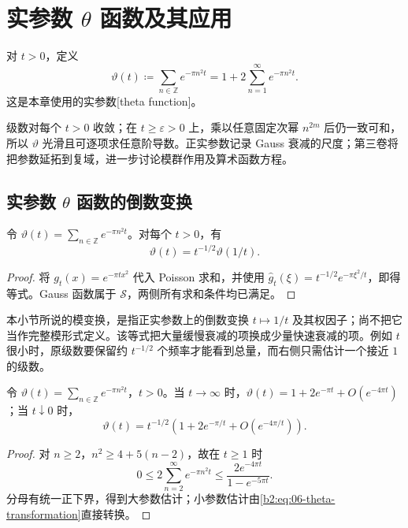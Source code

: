 \section{实参数 \texorpdfstring{\(\theta\)}{\AnalysisPdfTheta} 函数及其应用}
\label{b2:sec:0603}

\begin{definition}\label{b2:def:06-theta}
对 \(t>0\)，定义
\[
 \vartheta(t)\coloneqq\sum_{n\in\mathbb Z}e^{-\pi n^2t}
 =1+2\sum_{n=1}^\infty e^{-\pi n^2t}.
\]
这是本章使用的实参数[theta function]。
\end{definition}

级数对每个 \(t>0\) 收敛；在 \(t\geq\varepsilon>0\) 上，乘以任意固定次幂 \(n^{2m}\) 后仍一致可和，所以 \(\vartheta\) 光滑且可逐项求任意阶导数。正实参数记录 Gauss 衰减的尺度；第三卷将把参数延拓到复域，进一步讨论模群作用及算术函数方程。

\subsection{实参数 \texorpdfstring{\(\theta\)}{\AnalysisPdfTheta} 函数的倒数变换}
\label{b2:subsec:060301}

\begin{theorem}\label{b2:thm:06-theta-transformation}
令 \(\vartheta(t)=\sum_{n\in\mathbb Z}e^{-\pi n^2t}\)。对每个 \(t>0\)，有
\begin{equation}\label{b2:eq:06-theta-transformation}
 \vartheta(t)=t^{-1/2}\vartheta(1/t).
\end{equation}
\end{theorem}
\begin{proof}
将 \(g_t(x)=e^{-\pi t x^2}\) 代入 Poisson 求和，并使用 \(\widehat g_t(\xi)=t^{-1/2}e^{-\pi\xi^2/t}\)，即得等式。Gauss 函数属于 \(\mathcal S\)，两侧所有求和条件均已满足。
\end{proof}

本小节所说的模变换，是指正实参数上的倒数变换 \(t\mapsto1/t\) 及其权因子；尚不把它当作完整模形式定义。该等式把大量缓慢衰减的项换成少量快速衰减的项。例如 \(t\) 很小时，原级数要保留约 \(t^{-1/2}\) 个频率才能看到总量，而右侧只需估计一个接近 \(1\) 的级数。

\begin{corollary}\label{b2:cor:06-theta-asymptotics}
令 \(\vartheta(t)=\sum_{n\in\mathbb Z}e^{-\pi n^2t}\)，\(t>0\)。当 \(t\to\infty\) 时，\(\vartheta(t)=1+2e^{-\pi t}+O(e^{-4\pi t})\)；当 \(t\downarrow0\) 时，
\[
 \vartheta(t)=t^{-1/2}\left(1+2e^{-\pi/t}+O(e^{-4\pi/t})\right).
\]
\end{corollary}
\begin{proof}
对 \(n\geq2\)，\(n^2\geq4+5(n-2)\)，故在 \(t\geq1\) 时
\[
 0\leq2\sum_{n=2}^\infty e^{-\pi n^2t}
 \leq\dfrac{2e^{-4\pi t}}{1-e^{-5\pi t}}.
\]
分母有统一正下界，得到大参数估计；小参数估计由\eqref{b2:eq:06-theta-transformation}直接转换。
\end{proof}

